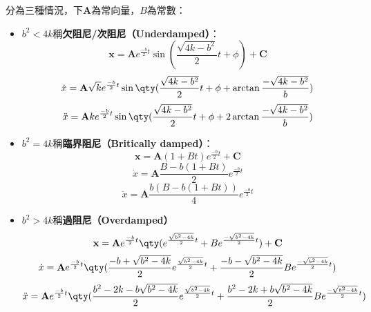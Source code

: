 \documentclass[a4paper,12pt]{article}
\begin{document}
分為三種情況，下$\mathbf{A}$為常向量，$B$為常數：
\begin{itemize}
\item $b^2<4k$稱\textbf{欠阻尼/次阻尼（Underdamped）}：
\[\mathbf{x}=\mathbf{A}e^{\frac{-b}{2}t}\sin(\frac{\sqrt{4k-b^2}}{2}t+\phi)+\mathbf{C}\]
\[\dot{x}=\mathbf{A}\sqrt{k}e^{\frac{-b}{2}t}\sin\qty(\frac{\sqrt{4k-b^2}}{2}t+\phi+\arctan\frac{-\sqrt{4k-b^2}}{b})\]
\[\ddot{x}=\mathbf{A}ke^{\frac{-b}{2}t}\sin\qty(\frac{\sqrt{4k-b^2}}{2}t+\phi+2\arctan\frac{-\sqrt{4k-b^2}}{b})\]
\item $b^2=4k$稱\textbf{臨界阻尼（Britically damped）}：
\[\mathbf{x}=\mathbf{A}(1+Bt)e^{\frac{-b}{2}t}+\mathbf{C}\]
\[\dot{x}=\mathbf{A}\frac{B-b(1+Bt)}{2}e^{\frac{-b}{2}t}\]
\[\ddot{x}=\mathbf{A}\frac{b(B-b(1+Bt))}{4}e^{\frac{-b}{2}t}\]
\item $b^2>4k$稱\textbf{過阻尼（Overdamped）}
\[\mathbf{x}=\mathbf{A}e^{\frac{-b}{2}t}\qty(e^{\frac{\sqrt{b^2-4k}}{2}t}+Be^{\frac{-\sqrt{b^2-4k}}{2}t})+\mathbf{C}\]
\[\dot{x}=\mathbf{A}e^{\frac{-b}{2}t}\qty(\frac{-b+\sqrt{b^2-4k}}{2}e^{\frac{\sqrt{b^2-4k}}{2}t}+\frac{-b-\sqrt{b^2-4k}}{2}Be^{\frac{-\sqrt{b^2-4k}}{2}t})\]
\[\ddot{x}=\mathbf{A}e^{\frac{-b}{2}t}\qty(\frac{b^2-2k-b\sqrt{b^2-4k}}{2}e^{\frac{\sqrt{b^2-4k}}{2}t}+\frac{b^2-2k+b\sqrt{b^2-4k}}{2}Be^{\frac{-\sqrt{b^2-4k}}{2}t})\]
\end{itemize}
\end{document}
